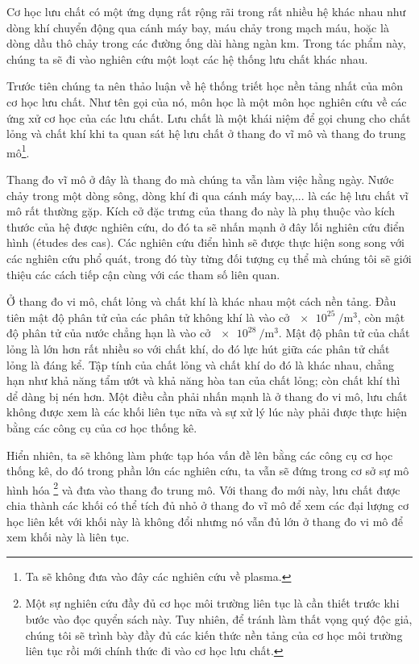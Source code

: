\documentclass[../../../main.tex]{subfiles}
\begin{document}
    Cơ học lưu chất có một ứng dụng rất rộng rãi trong rất nhiều hệ khác nhau như dòng khí chuyển động qua cánh máy bay, máu chảy trong mạch máu, hoặc là dòng dầu thô chảy trong các đường ống dài hàng ngàn km. Trong tác phẩm này, chúng ta sẽ đi vào nghiên cứu một loạt các hệ thống lưu chất khác nhau.

    Trước tiên chúng ta nên thảo luận về hệ thống triết học nền tảng nhất của môn cơ học lưu chất. Như tên gọi của nó, môn học  là một môn học nghiên cứu về các ứng xử cơ học của các lưu chất. Lưu chất là một khái niệm để gọi chung cho chất lỏng và chất khí khi ta quan sát hệ lưu chất ở thang đo vĩ mô và thang đo trung mô\footnote{Ta sẽ không đưa vào đây các nghiên cứu về plasma.}.

    Thang đo vĩ mô ở đây là thang đo mà chúng ta vẫn làm việc hằng ngày. Nước chảy trong một dòng sông, dòng khí đi qua cánh máy bay,... là các hệ lưu chất vĩ mô rất thường gặp. Kích cở đặc trưng của thang đo này là phụ thuộc vào kích thước của hệ được nghiên cứu, do đó ta sẽ nhấn mạnh ở đây lối nghiên cứu điển hình (études des cas). Các nghiên cứu điển hình sẽ được thực hiện song song với các nghiên cứu phổ quát, trong đó tùy từng đối tượng cụ thể mà chúng tôi sẽ giới thiệu các cách tiếp cận cùng với các tham số liên quan.

    Ở thang đo vi mô, chất lỏng và chất khí là khác nhau một cách nền tảng. Đầu tiên mật độ phân tử của các phân tử không khí là vào cở $\SI{e25}{\per\metre\cubed}$, còn mật độ phân tử của nước chẳng hạn là vào cở $\SI{e28}{\per\metre\cubed}$. Mật độ phân tử của chất lỏng là lớn hơn rất nhiều so với chất khí, do đó lực hút giữa các phân tử chất lỏng là đáng kể. Tập tính của chất lỏng và chất khí do đó là khác nhau, chẳng hạn như khả năng tẩm ướt và khả năng hòa tan của chất lỏng; còn chất khí thì dể dàng bị nén hơn. Một điều cần phải nhấn mạnh là ở thang đo vi mô, lưu chất không được xem là các khối liên tục nữa và sự xử lý lúc này phải được thực hiện bằng các công cụ của cơ học thống kê.

    Hiển nhiên, ta sẽ không làm phức tạp hóa vấn đề lên bằng các công cụ cơ học thống kê, do đó trong phần lớn các nghiên cứu, ta vẫn sẽ đứng trong cơ sở sự mô hình hóa \footnote{Một sự nghiên cứu đầy đủ cơ học môi trường liên tục là cần thiết trước khi bước vào đọc quyển sách này. Tuy nhiên, để tránh làm thất vọng quý độc giả, chúng tôi sẽ trình bày đầy đủ các kiến thức nền tảng của cơ học môi trường liên tục rồi mới chính thức đi vào cơ học lưu chất.} và đưa vào thang đo trung mô. Với thang đo mới này, lưu chất được chia thành các khối có thể tích đủ nhỏ ở thang đo vĩ mô để xem các đại lượng cơ học liên kết với khối này là không đổi nhưng nó vẫn đủ lớn ở thang đo vi mô để xem khối này là liên tục.
        
\end{document}
